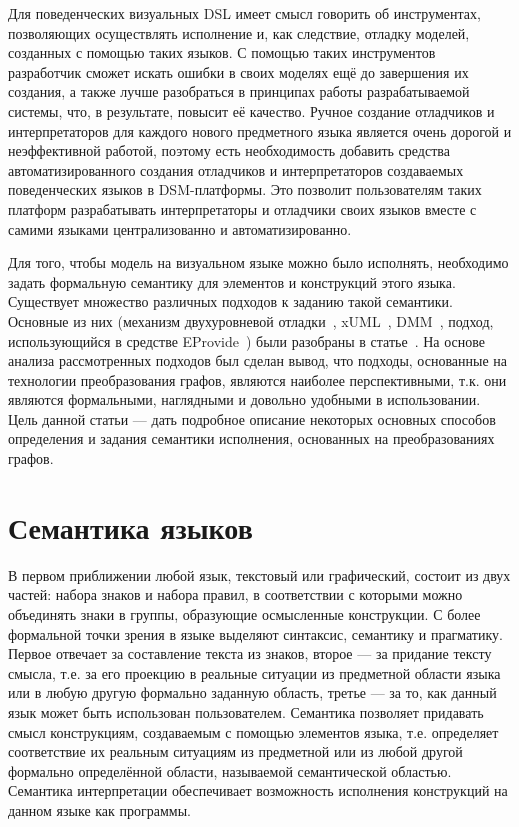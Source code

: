 \documentclass[a5paper]{article}
\begin{document}
Для поведенческих визуальных DSL имеет смысл говорить об инструментах, позволяющих осуществлять исполнение и, как следствие, отладку моделей, созданных с помощью таких языков. С помощью таких инструментов разработчик сможет искать ошибки в своих моделях ещё до завершения их создания, а также лучше разобраться в принципах работы разрабатываемой системы, что, в результате, повысит её качество. Ручное создание отладчиков и интерпретаторов для каждого нового предметного языка является очень дорогой и неэффективной работой, поэтому есть необходимость добавить средства автоматизированного создания отладчиков и интерпретаторов создаваемых поведенческих языков в DSM-платформы. Это позволит пользователям таких платформ разрабатывать интерпретаторы и отладчики своих языков вместе с самими языками централизованно и автоматизированно.

Для того, чтобы модель на визуальном языке можно было исполнять, необходимо задать формальную семантику для элементов и конструкций этого языка. Существует множество различных подходов к заданию такой семантики. Основные из них (механизм двухуровневой отладки~\cite{kartashev}, xUML~\cite{xuml}, DMM~\cite{dmm1}, подход, использующийся в средстве EProvide~\cite{eprov1, eprov2}) были разобраны в статье~\cite{part1}. На основе анализа рассмотренных подходов был сделан вывод, что подходы, основанные на технологии преобразования графов, являются наиболее перспективными, т.к. они являются формальными, наглядными и довольно удобными в использовании. Цель данной статьи --- дать подробное описание некоторых основных способов определения и задания семантики исполнения, основанных на преобразованиях графов. 


\section{Семантика языков}

В первом приближении любой язык, текстовый или графический, состоит из двух частей: набора знаков и набора правил, в соответствии с которыми можно объединять знаки в группы, образующие осмысленные конструкции. С более формальной точки зрения в языке выделяют синтаксис, семантику и прагматику. Первое отвечает за составление текста из знаков, второе --- за придание тексту смысла, т.е. за его проекцию в реальные ситуации из предметной области языка или в любую другую формально заданную область, третье --- за то, как данный язык может быть использован пользователем. Семантика позволяет придавать смысл конструкциям, создаваемым с помощью элементов языка, т.е. определяет соответствие их реальным ситуациям из предметной или из любой другой формально определённой области, называемой семантической областью. Семантика интерпретации обеспечивает возможность исполнения конструкций на данном языке как программы.
\end{document}
